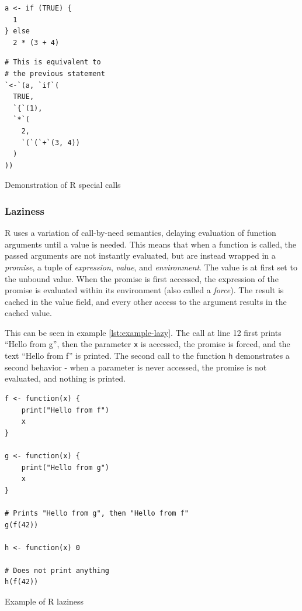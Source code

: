 \begin{listing}[t]
	\begin{sublisting}[t!]{0.47\textwidth}
		\centering
		\begin{verbatim}
a <- if (TRUE) {
  1
} else
  2 * (3 + 4)
    \end{verbatim}
	\end{sublisting}
	\hfill
	\begin{sublisting}[t!]{0.47\textwidth}
		\centering
		\begin{verbatim}
# This is equivalent to
# the previous statement
`<-`(a, `if`(
  TRUE,
  `{`(1),
  `*`(
    2,
    `(`(`+`(3, 4))
  )
))
    \end{verbatim}
	\end{sublisting}
	\caption{Demonstration of R special calls}\label{lst:r-special-calls}
\end{listing}

\subsubsection*{Laziness}

R uses a variation of call-by-need semantics, delaying evaluation of function arguments until a value is needed. This means that when a function is called, the passed arguments are not instantly evaluated, but are instead wrapped in a \textit{promise}, a tuple of \textit{expression}, \textit{value}, and \textit{environment}. The value is at first set to the unbound value. When the promise is first accessed, the expression of the promise is evaluated within its environment (also called a \textit{force}). The result is cached in the value field, and every other access to the argument results in the cached value.

This can be seen in example \ref{lst:example-lazy}. The call at line 12 first prints \enquote{Hello from g}, then the parameter \texttt{x} is accessed, the promise is forced, and the text \enquote{Hello from f} is printed. The second call to the function \texttt{h} demonstrates a second behavior - when a parameter is never accessed, the promise is not evaluated, and nothing is printed.

\begin{listing}[h!]
	\centering
	\begin{verbatim}
f <- function(x) {
    print("Hello from f")
    x
}

g <- function(x) {
    print("Hello from g")
    x
}

# Prints "Hello from g", then "Hello from f"
g(f(42))

h <- function(x) 0

# Does not print anything
h(f(42))
  \end{verbatim}
	\caption{Example of R laziness}\label{lst:example-lazy}
\end{listing}

